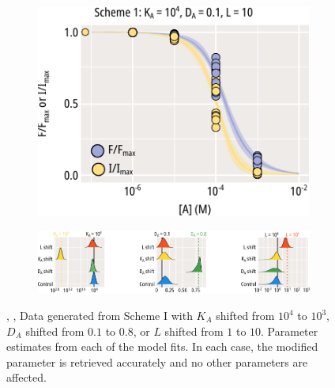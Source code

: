 \begin{figure}[h]
\begin{subfigure}[t]{0.3\textwidth}
		\centering
		\includegraphics[width=\textwidth]{mwc_scheme_1_l_shift.pdf}
	\end{subfigure}
	\vfill
	\begin{subfigure}[t]{0.9\textwidth}
		\caption{}\label{chxfig:mwc_params_2}
		\centering
		\includegraphics[width=\textwidth]{mwc_scheme_param_fits_2.pdf}
	\end{subfigure}
	\caption[Parameter retrieval from MWC models]{
	, ,  Data generated from Scheme I with  $K_A$ shifted from $10^4$ to $10^3$,  $D_A$ shifted from $0.1$ to $0.8$, or  $L$ shifted from $1$ to $10$.
	 Parameter estimates from each of the model fits.
	In each case, the modified parameter is retrieved accurately and no other parameters are affected.
	}\label{chxfig:scheme_1_shifts}
\end{figure}


